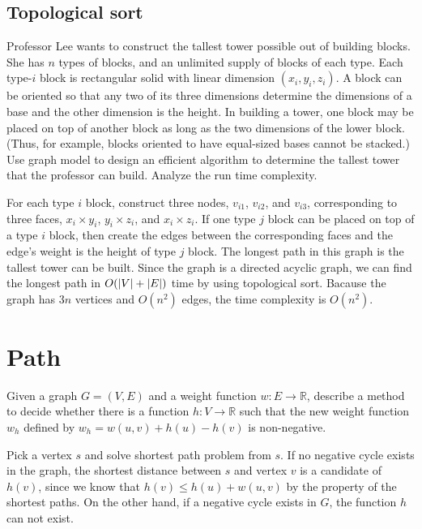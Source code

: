 \subsection{Topological sort}
\begin{Exercise}[origin={CYCU CSIE 92}]
Professor Lee wants to construct the tallest tower possible out of building blocks. She has $n$ types of blocks, and an unlimited supply of blocks of each type. Each type-$i$ block is rectangular solid with linear dimension $(x_i, y_i, z_i)$. A block can be oriented so that any two of its three dimensions determine the dimensions of a base and the other dimension is the height. In building a tower, one block may be placed on top of another block as long as the two dimensions of the lower block. (Thus, for example, blocks oriented to have equal-sized bases cannot be stacked.) Use graph model to design an efficient algorithm to determine the tallest tower that the professor can build. Analyze the run time complexity.
\end{Exercise}
\begin{Answer}
For each type $i$ block, construct three nodes, $v_{i1}$, $v_{i2}$, and $v_{i3}$, corresponding to three faces, $x_i \times y_i$, $y_i \times z_i$, and $x_i \times z_i$.  If one type $j$ block can be placed on top of a type $i$ block, then create the edges between the corresponding faces and the edge's weight is the height of type $j$ block. The longest path in this graph is the tallest tower can be built. Since the graph is a directed acyclic graph, we can find the longest path in $O(\lvert V\rvert + \lvert E\rvert)$ time by using topological sort. Bacause the graph has $3n$ vertices and $O(n^2)$ edges, the time complexity is $O(n^2)$.
\end{Answer}

\section{Path}
\begin{Exercise}[title={Johnson's algorithm},origin={NTPU CSIE 100}]
Given a graph $G = (V, E)$ and a weight function $w: E \rightarrow \mathbb{R}$, describe a method to decide whether there is a function $h: V \rightarrow \mathbb{R}$ such that the new weight function $w_h$ defined by $w_h = w(u, v) + h(u) - h(v)$ is non-negative.
\end{Exercise}
\begin{Answer}
Pick a vertex $s$ and solve shortest path problem from $s$. If no negative cycle exists in the graph, the shortest distance between $s$ and vertex $v$ is a candidate of $h(v)$, since we know that $h(v) \leq h(u) + w(u, v)$ by the property of the shortest paths. On the other hand, if a negative cycle exists in $G$, the function $h$ can not exist.
\end{Answer}

